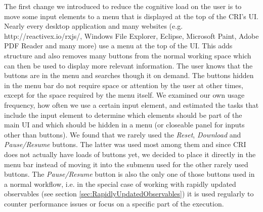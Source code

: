 The first change we introduced to reduce the cognitive load on the user is to move some input elements to a menu that is displayed at the top of the CRI's UI. Nearly every desktop application and many websites (e.g. http://reactivex.io/rxjs/, Windows File Explorer, Eclipse, Microsoft Paint, Adobe PDF Reader and many more) use a menu at the top of the UI. This adds structure and also removes many buttons from the normal working space which can then be used to display more relevant information. The user knows that the buttons are in the menu and searches though it on demand. The buttons hidden in the menu bar do not require space or attention by the user at other times, except for the space required by the menu itself. We examined our own usage frequency, how often we use a certain input element, and estimated the tasks that include the input element to determine which elements should be part of the main UI and which should be hidden in a menu (or closeable panel for inputs other than buttons). We found that we rarely used the \emph{Reset}, \emph{Download} and \emph{Pause/Resume} buttons. The latter was used most among them and since CRI does not actually have loads of buttons yet, we decided to place it directly in the menu bar instead of moving it into the submenu used for the other rarely used buttons. The \emph{Pause/Resume} button is also the only one of those buttons used in a normal workflow, i.e. in the special case of working with rapidly updated observables (see section \ref{sec:RapidlyUpdatedObservables}) it is used regularly to counter performance issues or focus on a specific part of the execution.
